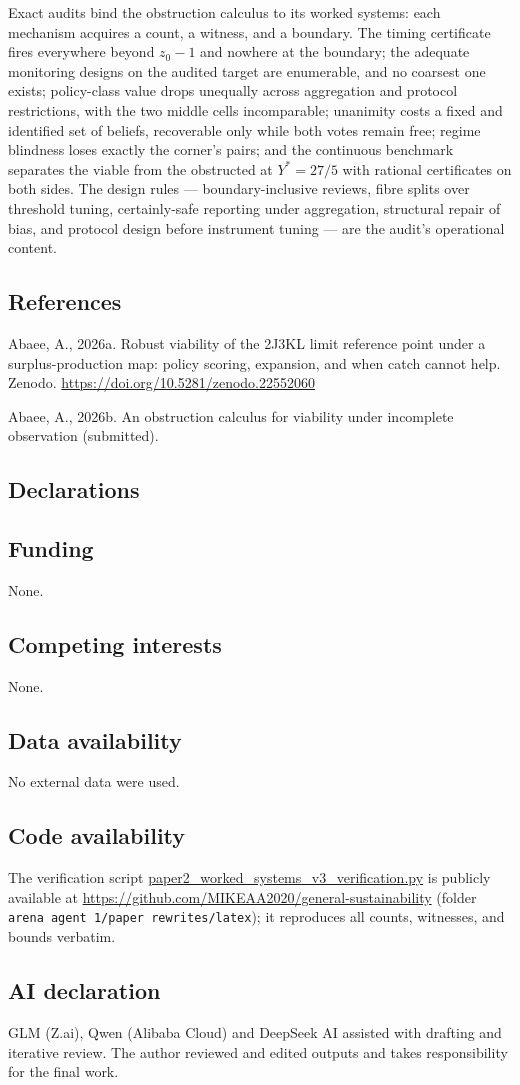 \documentclass[10pt,twocolumn]{article}
\theoremstyle{definition}
\begin{document}
Exact audits bind the obstruction calculus to its worked systems: each
mechanism acquires a count, a witness, and a boundary. The timing
certificate fires everywhere beyond \(z_0 - 1\) and nowhere at the
boundary; the adequate monitoring designs on the audited target are
enumerable, and no coarsest one exists; policy-class value drops
unequally across aggregation and protocol restrictions, with the two
middle cells incomparable; unanimity costs a fixed and identified set
of beliefs, recoverable only while both votes remain free; regime
blindness loses exactly the corner's pairs; and the continuous
benchmark separates the viable from the obstructed at \(Y^{*} = 27/5\)
with rational certificates on both sides. The design rules ---
boundary-inclusive reviews, fibre splits over threshold tuning,
certainly-safe reporting under aggregation, structural repair of bias,
and protocol design before instrument tuning --- are the audit's
operational content.

\subsection*{References}

Abaee, A., 2026a. Robust viability of the 2J3KL limit reference point
under a surplus-production map: policy scoring, expansion, and when
catch cannot help. Zenodo.
\url{https://doi.org/10.5281/zenodo.22552060}

Abaee, A., 2026b. An obstruction calculus for viability under
incomplete observation (submitted).

\subsection*{Declarations}

\subsection*{Funding}
None.

\subsection*{Competing interests}
None.

\subsection*{Data availability}
No external data were used.

\subsection*{Code availability}
The verification script \url{paper2_worked_systems_v3_verification.py}
is publicly available at
\url{https://github.com/MIKEAA2020/general-sustainability} (folder
\texttt{arena agent 1/paper rewrites/latex}); it reproduces all counts,
witnesses, and bounds verbatim.

\subsection*{AI declaration}
GLM (Z.ai), Qwen (Alibaba Cloud) and DeepSeek AI assisted with drafting
and iterative review. The author reviewed and edited outputs and takes
responsibility for the final work.
\end{document}
